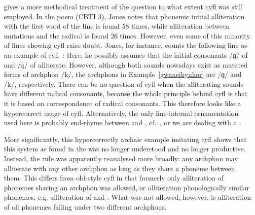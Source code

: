 \Textcite{jones_meddwl_2005} gives a more methodical treatment of the question to what extent \gls{cyfl} was still employed. In the poem  (\acrshort{CBTI} 3), Jones notes that phonemic initial alliteration with the first word of the line is found 58 times, while alliteration between mutations and the radical is found 26 times. 
However, even some of this minority of lines showing  \gls{cyfl} raise doubt. Jones, for instance, counts the following line as an example of \gls{cyfl}~\parencite[162]{jones_meddwl_2005}:
Here, he possibly assumes that the initial consonants /ɡ/ of  and /ŋ̊/ of  alliterate. However, although both sounds nowadays exist as mutated forms of \gls{archphon} /k/, the \gls{archphon}s in Example~\ref{gwaneikynhor}  are /ɡ/ and /k/, respectively. There can be no question of \gls{cyfl} when the alliterating sounds have different radical consonants, because the whole principle behind \gls{cyfl} is that it is based on correspondence of radical consonants. This therefore looks like a hypercorrect usage of \gls{cyfl}. Alternatively, the only line-internal ornamentation used here is probably end-rhyme between  and , cf.\ \textcite[xlvii]{andrews_welsh_2007}, or we are dealing with a .


More significantly, this hypercorrectly archaic example imitating \gls{cyfl} shows that this system as found in the  was no longer understood and no longer productive. Instead, the rule was apparently reanalysed more broadly: any \gls{archphon} may alliterate with any other \gls{archphon} as long as they share a phoneme between them. This differs from old-style \gls{cyfl} in that formerly only alliteration of phonemes sharing an \gls{archphon} was allowed, or alliteration phonologically similar phonemes, e.g. alliteration of  and . What was not allowed, however, is alliteration of all phonemes falling under two different \gls{archphon}s.

